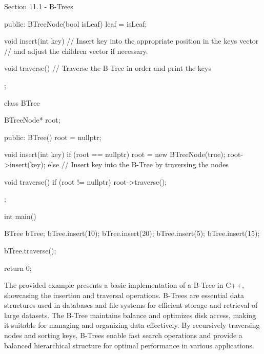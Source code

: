 \begin{notes}{Section 11.1 - B-Trees}
\begin{highlight}
\begin{code}[C++]
{    public:
        BTreeNode(bool isLeaf) {
            leaf = isLeaf;
        }
    
        void insert(int key) {
            // Insert key into the appropriate position in the keys vector
            // and adjust the children vector if necessary.
        }
    
        void traverse() {
            // Traverse the B-Tree in order and print the keys
        }
    };
    
    class BTree {
        BTreeNode* root;
    
    public:
        BTree() {
            root = nullptr;
        }
    
        void insert(int key) {
            if (root == nullptr) {
                root = new BTreeNode(true);
                root->insert(key);
            } else {
                // Insert key into the B-Tree by traversing the nodes
            }
        }
    
        void traverse() {
            if (root != nullptr) {
                root->traverse();
            }
        }
    };
    
    int main() {
        BTree bTree;
        bTree.insert(10);
        bTree.insert(20);
        bTree.insert(5);
        bTree.insert(15);
    
        bTree.traverse();
    
        return 0;
    }
    \end{code}
        The provided example presents a basic implementation of a B-Tree in C++, showcasing the insertion and traversal operations. B-Trees are essential data structures used in databases and file systems for efficient storage and retrieval of large datasets. The B-Tree maintains balance and optimizes disk access, making it suitable for managing 
        and organizing data effectively. By recursively traversing nodes and sorting keys, B-Trees enable fast search operations and provide a balanced hierarchical structure for optimal performance in various applications.
    \end{highlight}
\end{notes}

